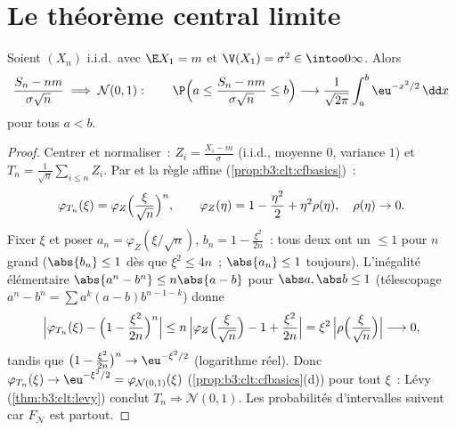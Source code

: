 \section{Le théorème central limite}

\begin{theorem}\label{thm:b3:clt:clt}
Soient $(X_n)$ i.i.d.\ avec $\E X_1 = m$ et $\V(X_1) =
\sigma^2 \in \intoo0\infty$. Alors
\[
\frac{S_n - nm}{\sigma\sqrt n} \;\Longrightarrow\; \mathcal
N(0, 1) :
\qquad
\P\Bigl(a \leq \frac{S_n - nm}{\sigma\sqrt n} \leq
b\Bigr) \longrightarrow
\frac{1}{\sqrt{2\pi}}\int_a^b\eu^{-x^2/2}\,\dd x
\]
pour tous $a < b$.
\end{theorem}

\begin{proof}
Centrer et normaliser~: $Z_i = \frac{X_i - m}{\sigma}$
(i.i.d., moyenne $0$, variance $1$) et $T_n =
\frac1{\sqrt n}\sum_{i\leq n}Z_i$. Par  et la
règle affine (\cref{prop:b3:clt:cfbasics})~:
\[
\varphi_{T_n}(\xi) =
\varphi_{Z}\Bigl(\frac{\xi}{\sqrt n}\Bigr)^{n},
\qquad
\varphi_Z(\eta) = 1 - \frac{\eta^2}2 + \eta^2\rho(\eta),\quad
\rho(\eta)\to0 .
\]
Fixer $\xi$ et poser $a_n = \varphi_Z(\xi/\sqrt n)$, $b_n =
1 - \frac{\xi^2}{2n}$~: tous deux ont un  $\leq 1$
pour $n$ grand ($\abs{b_n} \leq 1$ dès que $\xi^2 \leq 4n$~;
$\abs{a_n} \leq 1$ toujours). L'inégalité élémentaire
$\abs{a^n - b^n} \leq n\abs{a - b}$ pour $\abs a, \abs b
\leq 1$ (télescopage $a^n - b^n = \sum a^k(a - b)b^{n-1-k}$)
donne
\[
\Bigl|\varphi_{T_n}(\xi) - \Bigl(1 -
\frac{\xi^2}{2n}\Bigr)^{n}\Bigr|
\leq n\,\Bigl|\varphi_Z\Bigl(\frac\xi{\sqrt n}\Bigr) - 1 +
\frac{\xi^2}{2n}\Bigr|
= \xi^2\,\Bigl|\rho\Bigl(\frac{\xi}{\sqrt n}\Bigr)\Bigr|
\longrightarrow 0,
\]
tandis que $\bigl(1 - \frac{\xi^2}{2n}\bigr)^n \to
\eu^{-\xi^2/2}$ (logarithme réel). Donc $\varphi_{T_n}(\xi)
\to \eu^{-\xi^2/2} = \varphi_{\mathcal N(0,1)}(\xi)$
(\cref{prop:b3:clt:cfbasics}(d)) pour tout $\xi$~: Lévy
(\cref{thm:b3:clt:levy}) conclut $T_n \Rightarrow \mathcal
N(0,1)$. Les probabilités d'intervalles suivent car
$F_{\mathcal N}$ est  partout.
\end{proof}

